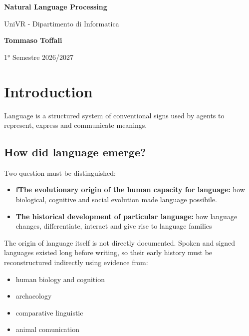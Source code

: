 \documentclass[a4paper]{article}
\theoremstyle{definition}
\begin{document}
\begin{titlepage}
	\begin{center}
		\vspace*{1cm}

		\Huge
		\textbf{Natural Language Processing}

		\vspace{0.5cm}
		\LARGE
		UniVR - Dipartimento di Informatica

		\vspace{1.5cm}

		\textbf{Tommaso Toffali}

		\vfill


		\vspace{0.8cm}


		1° Semestre 2026/2027
    \end{center}
\end{titlepage}

\tableofcontents
\pagebreak

\section{Introduction}
Language is a structured system of conventional signs used by agents to represent,
express and communicate meanings.

\subsection{How did language emerge?}
Two question must be distinguished:
\begin{itemize}
    \item \textbf{fThe evolutionary origin of the human capacity for language:} how biological, cognitive and 
        social evolution made language possibile.
    \item \textbf{The historical development of particular language:} how language changes, differentiate, interact
        and give rise to language families
\end{itemize}
The origin of language itself is not directly documented. Spoken and signed languages existed long before
writing, so their early history must be reconstructured indirectly using evidence from:
\begin{itemize}
    \item human biology and cognition
    \item archaeology
    \item comparative linguistic
    \item animal comunication
\end{itemize}
\end{document}
